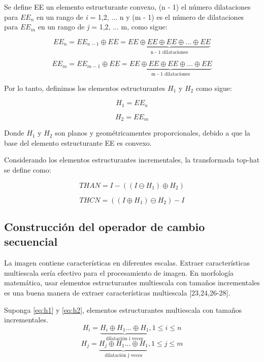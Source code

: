 \documentclass[a4paper, 11 pt, conference]{ieeeconf}      %
\begin{document}
Se define EE un elemento estructurante convexo, (n - 1) el n\'umero dilataciones para $EE_n$ en un rango de \textit{i} = 1,2, ... n y (m - 1) es el n\'umero de dilataciones para $EE_m$ en un rango de \textit{j} = 1,2, ... m, como sigue:

$$
EE_n = EE_{n-1} \oplus EE = \underbrace{EE \oplus EE \oplus EE \oplus ... \oplus EE}_\text{n - 1 dilataciones}
$$

$$
EE_m = EE_{m-1} \oplus EE = \underbrace{EE \oplus EE \oplus EE \oplus ... \oplus EE}_\text{m - 1 dilataciones}
$$

Por lo tanto, definimos los elementos estructurantes $H_1$ y $H_2$ como sigue:

\begin{equation} \label{eq:h1}
H_1 = EE_n    
\end{equation}

\begin{equation} \label{eq:h2}
H_2 = EE_m
\end{equation}

Donde $H_1$ y $H_2$ son planos y geom\'etricamentes proporcionales, debido a que la base del elemento estructurante EE es convexo.

Considerando los elementos estructurantes incrementales, la transformada top-hat se define como:

\begin{equation} \label{eq:th1}
THAN = I - ((I \ominus H_1) \oplus H_2)
\end{equation}

\begin{equation} \label{eq:th2}
THCN = ((I \oplus H_1) \ominus H_2) - I    
\end{equation}


\subsection{Construcci\'on del operador de cambio secuencial} 
La imagen contiene caracter\'isticas en diferentes escalas. Extraer caracter\'isticas multiescala ser\'ia efectivo para el procesamiento de imagen. En morfolog\'ia matem\'atica, usar elementos estructurantes multiescala con tamaños incrementales es una buena manera de extraer caracter\'isticas multiescala [23,24,26-28]. 

Suponga \eqref{eq:h1} y \eqref{eq:h2}, elementos estructurantes multiescala con tamaños incrementales. 
$$ 
H_i = \underbrace{H_i \oplus H_1 ... \oplus H_1 }_\text{dilataci\'on i veces}, 1 \leq i \leq n 
$$ 
$$ 
H_j = \underbrace{H_j \oplus H_1 ... \oplus H_1 }_\text{dilataci\'on j veces}, 1 \leq j \leq m 
$$ 
\end{document}
